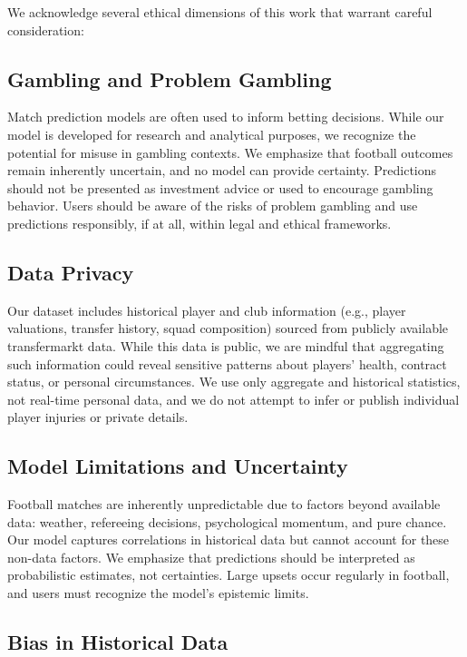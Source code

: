 \documentclass{article}
\begin{document}
We acknowledge several ethical dimensions of this work that warrant careful consideration:

\subsection{Gambling and Problem Gambling}

Match prediction models are often used to inform betting decisions. While our model is developed for research and analytical purposes, we recognize the potential for misuse in gambling contexts. We emphasize that football outcomes remain inherently uncertain, and no model can provide certainty. Predictions should not be presented as investment advice or used to encourage gambling behavior. Users should be aware of the risks of problem gambling and use predictions responsibly, if at all, within legal and ethical frameworks.

\subsection{Data Privacy}

Our dataset includes historical player and club information (e.g., player valuations, transfer history, squad composition) sourced from publicly available transfermarkt data. While this data is public, we are mindful that aggregating such information could reveal sensitive patterns about players' health, contract status, or personal circumstances. We use only aggregate and historical statistics, not real-time personal data, and we do not attempt to infer or publish individual player injuries or private details.

\subsection{Model Limitations and Uncertainty}

Football matches are inherently unpredictable due to factors beyond available data: weather, refereeing decisions, psychological momentum, and pure chance. Our model captures correlations in historical data but cannot account for these non-data factors. We emphasize that predictions should be interpreted as probabilistic estimates, not certainties. Large upsets occur regularly in football, and users must recognize the model's epistemic limits.

\subsection{Bias in Historical Data}
\end{document}
